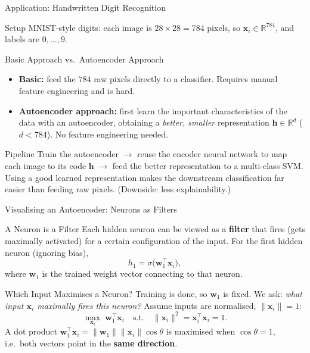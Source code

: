 \documentclass{beamer}
\begin{document}
\begin{frame}[shrink=10]{Application: Handwritten Digit Recognition}
  \begin{block}{Setup}
    MNIST-style digits: each image is $28\times28 = 784$ pixels, so
    $\mathbf{x}_i \in \mathbb{R}^{784}$, and labels are $0,\ldots,9$.
  \end{block}

  \begin{block}{Basic Approach vs.\ Autoencoder Approach}
    \begin{itemize}\setlength\itemsep{4pt}
      \item \textbf{Basic:} feed the $784$ raw pixels directly to a
            classifier. Requires manual feature engineering and is hard.
      \item \textbf{Autoencoder approach:} first learn the important
            characteristics of the data with an autoencoder, obtaining a
            \emph{better, smaller} representation $\mathbf{h}\in\mathbb{R}^{d}$
            ($d < 784$). No feature engineering needed.
    \end{itemize}
  \end{block}

  \begin{exampleblock}{Pipeline}
    Train the autoencoder $\to$ reuse the encoder neural network to map
    each image to its code $\mathbf{h}$ $\to$ feed the better
    representation to a multi-class SVM. Using a good learned
    representation makes the downstream classification far easier than
    feeding raw pixels. (Downside: less explainability.)
  \end{exampleblock}
\end{frame}

\begin{frame}[shrink=10]{Visualising an Autoencoder: Neurons as Filters}
  \begin{block}{A Neuron is a Filter}
    Each hidden neuron can be viewed as a \textbf{filter} that fires (gets
    maximally activated) for a certain configuration of the input. For the
    first hidden neuron (ignoring bias),
    \[
      h_1 = \sigma\bigl(\mathbf{w}_1^{\top}\mathbf{x}_i\bigr),
    \]
    where $\mathbf{w}_1$ is the trained weight vector connecting to that
    neuron.
  \end{block}

  \begin{block}{Which Input Maximises a Neuron?}
    Training is done, so $\mathbf{w}_1$ is fixed. We ask: \emph{what input
    $\mathbf{x}_i$ maximally fires this neuron?} Assume inputs are
    normalised, $\|\mathbf{x}_i\|=1$:
    \[
      \max_{\mathbf{x}_i}\; \mathbf{w}_1^{\top}\mathbf{x}_i
      \quad\text{s.t.}\quad
      \|\mathbf{x}_i\|^2 = \mathbf{x}_i^{\top}\mathbf{x}_i = 1.
    \]
    A dot product $\mathbf{w}_1^{\top}\mathbf{x}_i =
    \|\mathbf{w}_1\|\|\mathbf{x}_i\|\cos\theta$ is maximised when
    $\cos\theta = 1$, i.e.\ both vectors point in the \textbf{same
    direction}.
  \end{block}
\end{frame}
\end{document}
